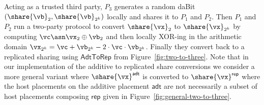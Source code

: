 Acting as a trusted third party, $P_3$ generates a random daBit $(\share{\vb}_2,
\share{\vb}_{2^k})$ locally and shares it to $P_1$ and $P_2$. Then $P_1$ and
$P_2$ run a two-party protocol to convert $\share{\vx}_2$ to $\share{\vx}_{2^k}$
by computing $\vc \asn \vx_2 \oplus \vb_2$ and then locally XOR-ing in the
arithmetic domain $\vx_{2^k} = \vc + \vb_{2^k} - 2 \cdot \vc \cdot \vb_{2^k}$.
Finally they convert back to a replicated sharing using
$\mathsf{AdtToRep}$ from Figure~\ref{fig:two-to-three}. Note that in our
implementation of the additive to replicated share conversions we consider a
more general variant where $\share{\vx}^\mathsf{adt}$ is converted to
$\share{\vx}^\mathsf{rep}$ where the host placements on the additive placement
$\mathsf{adt}$ are not necessarily a subset of host placements composing
$\mathsf{rep}$ given in Figure~\ref{fig:general-two-to-three}.



% 
